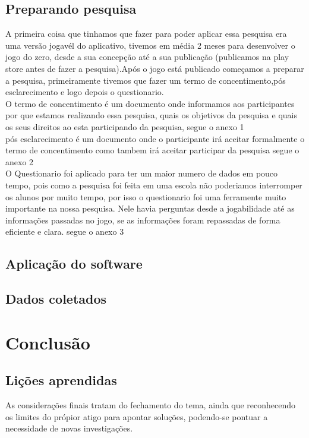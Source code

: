 \documentclass[12pt]{article}
\begin{document}
	\subsection{Preparando pesquisa} %
		A primeira coisa que tinhamos que fazer para poder aplicar essa pesquisa era uma versão jogavél do aplicativo, tivemos em média 2 meses para desenvolver o jogo do zero, desde a sua concepção até a sua publicação (publicamos na play store antes de fazer a pesquisa).Após o jogo está publicado começamos a preparar a pesquisa, primeiramente tivemos que fazer um termo de concentimento,pós esclarecimento e logo depois o questionario.\\
		
		O termo de concentimento é um documento onde informamos aos participantes por que estamos realizando essa pesquisa, quais os objetivos da pesquisa e quais os seus direitos ao esta participando da pesquisa, segue o anexo 1 \\
		
		pós esclarecimento é um documento onde o participante irá aceitar formalmente o termo de concentimento como tambem irá aceitar participar da pesquisa segue o anexo 2 \\
		
		O Questionario foi aplicado para ter um maior numero de dados em pouco tempo, pois como a pesquisa foi feita em uma escola não poderiamos interromper os alunos por muito tempo, por isso o questionario foi uma ferramente muito importante na nossa pesquisa. Nele havia perguntas desde a jogabilidade até as informações passadas no jogo, se as informações foram repassadas de forma eficiente e clara. segue o anexo 3\\
		
		
	\subsection{Aplicação do software}%
	\subsection{Dados coletados} %
	
	
	\section{Conclusão}
	\subsection{Lições aprendidas}
		As considerações finais tratam do fechamento do tema, ainda que reconhecendo os limites do própior atigo para apontar soluções, podendo-se pontuar a necessidade de novas investigações.
	
\end{document}
